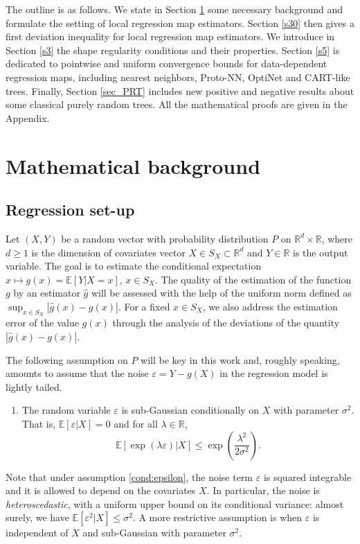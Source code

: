 \documentclass[paper=a4, fontsize=11pt]{scrartcl}
\begin{document}
The outline is as follows. We state in Section \ref{s2} some necessary background and formulate the setting of local regression map estimators. Section \ref{s30} then gives a first deviation inequality for local regression map estimators. We introduce in Section \ref{s3} the shape regularity conditions and their properties. Section \ref{s5} is dedicated to pointwise and uniform convergence bounds for data-dependent regression maps, including nearest neighbors, Proto-NN, OptiNet and CART-like trees.  Finally, Section \ref{sec_PRT}  includes new positive and negative results about some classical purely random trees. All the mathematical proofs are given in the Appendix.


\section{Mathematical background}\label{s2}

\subsection{Regression set-up}\label{s21}

Let $(X,Y)$ be a random vector with probability distribution $ P$ on $\mathbb R^d \times \mathbb R$, where $d\geq 1$ is the dimension of covariates vector $X\in S_X \subset\mathbb R^d$ and $Y \in \mathbb R$ is the output variable.  The goal is to estimate the conditional expectation $x\mapsto g(x) = \mathbb E [ Y|X= x]$, $x\in S_X$. The quality of the estimation of the function $g$ by an estimator $\hat g$ will be assessed with the help of the uniform norm defined as $\sup_{x\in S_X} | \hat g(x) - g(x) | $. %
For a fixed $x\in S_X$, we also address the estimation error of the value $g(x)$ through the analysis of the deviations of the quantity $| \hat g(x) - g(x) | $. 

The following assumption on $ P$ will be key in this work and, roughly speaking, amounts to assume that the noise $\varepsilon = Y  - g(X)$ in the regression model is lightly tailed.

\begin{enumerate}[label=(E), wide=0.5em,  leftmargin=*]
\item \label{cond:epsilon} 
The random variable $\varepsilon$ is sub-Gaussian conditionally on $X$ with parameter $\sigma^2$. That is, $\mathbb E [\varepsilon |X ]= 0$ and for all $\lambda \in \mathbb R$, $$ \mathbb E [ \exp( \lambda\varepsilon  ) |X ] \leq \exp\left( \frac{ \lambda ^2}{   2\sigma^2 }\right).$$
\end{enumerate}
Note that under assumption \ref{cond:epsilon}, the noise term $\varepsilon$ is squared integrable and it is allowed to depend on the covariates $X$.  In particular, the noise is \textit{heteroscedastic}, with a uniform upper bound on its conditional variance: almost surely, we have $\mathbb{E}[\varepsilon^2\vert X] \leq \sigma^2$. A more restrictive assumption is when $\varepsilon$ is independent of $X $ and sub-Gaussian with parameter $\sigma^2$.
\end{document}

